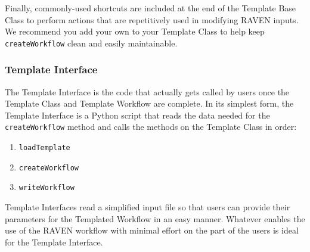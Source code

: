 Finally, commonly-used shortcuts are included at the end of the Template Base Class to perform actions that are repetitively used in modifying RAVEN inputs. We recommend you add your own to your Template Class to help keep
\texttt{createWorkflow} clean and easily maintainable.



\subsubsection{Template Interface}
The Template Interface is the code that actually gets called by users once the Template Class and Template Workflow are complete. In its simplest form, the Template Interface is a Python script that reads the data needed for the \texttt{createWorkflow} method and calls the methods on the Template Class in order:
\begin{enumerate}
  \item \texttt{loadTemplate}
  \item \texttt{createWorkflow}
  \item \texttt{writeWorkflow}
\end{enumerate}
Template Interfaces read a simplified input file so that users can provide their parameters for the Templated Workflow in an easy manner. Whatever enables the use of the RAVEN workflow with minimal effort on the part of the users is ideal for the Template Interface.





